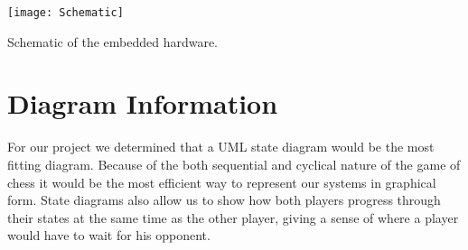 \documentclass{article}
\begin{document}
\centerline{\texttt{[image: Schematic]}}

\begin{center}
Schematic of the embedded hardware.
\end{center}

\vspace*{5mm}

\section*{Diagram Information}
\indent

For our project we determined that a UML state diagram would be the most fitting diagram. Because of the both sequential and cyclical nature of the game of chess it would be the most efficient way to represent our systems in graphical form. State diagrams also allow us to show how both players progress through their states at the same time as the other player, giving a sense of where a player would have to wait for his opponent.
\end{document}
